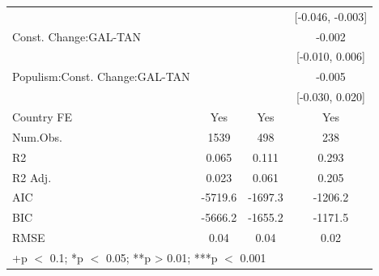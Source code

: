 \documentclass[
  abstract]{article}
\begin{document}
\begin{table}
\begin{tabular}[t]{lccc}
 &  &  & {}[-0.046, -0.003]\\
Const. Change:GAL-TAN &  &  & -0.002\\
 &  &  & {}[-0.010, 0.006]\\
Populism:Const. Change:GAL-TAN &  &  & -0.005\\
 &  &  & {}[-0.030, 0.020]\\
\midrule
Country FE & Yes & Yes & Yes\\
Num.Obs. & 1539 & 498 & 238\\
R2 & 0.065 & 0.111 & 0.293\\
R2 Adj. & 0.023 & 0.061 & 0.205\\
AIC & -5719.6 & -1697.3 & -1206.2\\
BIC & -5666.2 & -1655.2 & -1171.5\\
RMSE & 0.04 & 0.04 & 0.02\\
\bottomrule
\multicolumn{4}{l}{\rule{0pt}{1em}+p $<$ 0.1; *p $<$ 0.05; **p > 0.01; ***p $<$ 0.001}\\
\end{tabular}
\end{table}
\end{document}
